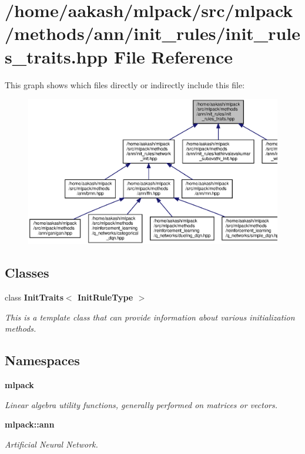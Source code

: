 \section{/home/aakash/mlpack/src/mlpack/methods/ann/init\+\_\+rules/init\+\_\+rules\+\_\+traits.hpp File Reference}
\label{init__rules__traits_8hpp}
This graph shows which files directly or indirectly include this file\+:
\nopagebreak
\begin{figure}[H]
\begin{center}
\leavevmode
\includegraphics[width=350pt]{init__rules__traits_8hpp__dep__incl}
\end{center}
\end{figure}
\subsection*{Classes}
\begin{DoxyCompactItemize}
\item 
class \textbf{ Init\+Traits$<$ Init\+Rule\+Type $>$}
\begin{DoxyCompactList}\small\item\em This is a template class that can provide information about various initialization methods. \end{DoxyCompactList}\end{DoxyCompactItemize}
\subsection*{Namespaces}
\begin{DoxyCompactItemize}
\item 
 \textbf{ mlpack}
\begin{DoxyCompactList}\small\item\em Linear algebra utility functions, generally performed on matrices or vectors. \end{DoxyCompactList}\item 
 \textbf{ mlpack\+::ann}
\begin{DoxyCompactList}\small\item\em Artificial Neural Network. \end{DoxyCompactList}\end{DoxyCompactItemize}



